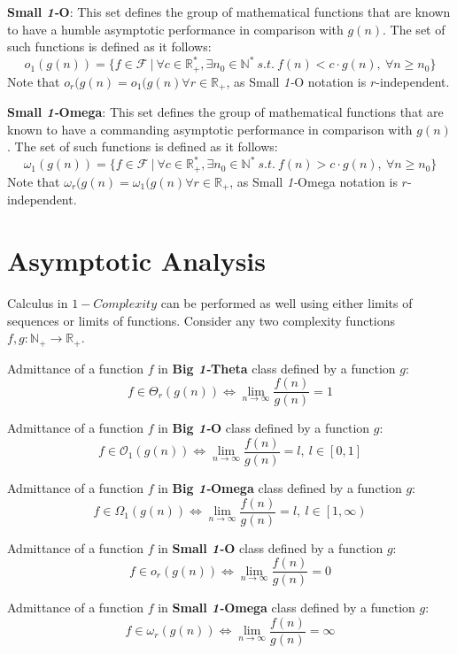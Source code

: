 \begin{definition}
\textbf{Small \textit{1-}O}:
  This set defines the group of mathematical functions that are known to have a humble
 asymptotic performance in comparison with  $g(n)$. The set of such functions is defined as it follows:
  \[o_{1}(g(n)) = \lbrace f \in \mathcal{F}\ |\ \forall c \in \mathbb{R}^{*}_{+}, \exists n_{0} \in \mathbb{N}^{*}\ s.t.\  f(n) < c \cdot g(n),\  \forall n \geq n_{0} \rbrace\]
Note that $o_{r}(g(n) = o_{1}(g(n) \forall r\in  \mathbb{R}_{+}$, as Small \textit{1-}O  notation is $r$-independent.
\end{definition}
\begin{definition} \textbf{Small \textit{1-}Omega}:
  This set defines the group of mathematical functions that are known to have a commanding asymptotic performance in comparison with  $g(n)$.
  The set of such functions is defined as it follows:
  \[\omega_{1}(g(n)) = \lbrace f \in \mathcal{F}\ |\ \forall c \in \mathbb{R}^{*}_{+}, \exists n_{0} \in \mathbb{N}^{*}\ s.t.\  f(n) > c \cdot g(n),\  \forall n \geq n_{0} \rbrace\]
    Note that $\omega_{r}(g(n) = \omega_{1}(g(n) \forall r\in  \mathbb{R}_{+}$, as Small \textit{1-}Omega  notation is $r$-independent.
\end{definition}

\section{Asymptotic Analysis}
Calculus in $1-Complexity$ can be performed as well using either limits of sequences or limits of functions. Consider any two complexity functions $f,g:\mathbb{N}_{+}\longrightarrow\mathbb{R}_{+}$.

\begin{theorem} Admittance of a function $f$ in \textbf{Big \textit{1-}Theta} class defined by a function $g$: 
\[ f \in \Theta_{r}(g(n)) \Leftrightarrow \lim_{n\to\infty} \dfrac{f(n)}{g(n)} = 1 \]
\end{theorem} 
\begin{theorem} Admittance of a function $f$ in \textbf{Big \textit{1-}O} class defined by a function $g$: 
\[ f \in \mathcal{O}_{1}(g(n)) \Leftrightarrow \lim_{n\to\infty} \dfrac{f(n)}{g(n)} = l,\ l \in \left[ 0, 1 \right] \]
\end{theorem} 
\begin{theorem} Admittance of a function $f$ in \textbf{Big \textit{1-}Omega} class defined by a function $g$: 
\[ f \in \Omega_{1}(g(n)) \Leftrightarrow \lim_{n\to\infty} \dfrac{f(n)}{g(n)} = l,\ l \in \left[ 1, \infty \right) \]
\end{theorem} 
\begin{theorem} Admittance of a function $f$ in \textbf{Small \textit{1-}O} class defined by a function $g$: 
\[ f \in o_{r}(g(n)) \Leftrightarrow \lim_{n\to\infty} \dfrac{f(n)}{g(n)} = 0 \]
\end{theorem} 
\begin{theorem} Admittance of a function $f$ in \textbf{Small \textit{1-}Omega} class defined by a function $g$: 
 \[ f \in \omega_{r}(g(n)) \Leftrightarrow \lim_{n\to\infty} \dfrac{f(n)}{g(n)} = \infty \]
\end{theorem} 




